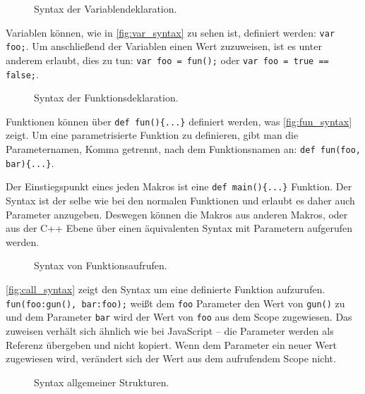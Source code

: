     \begin{figure}[H]
      \centering
      \caption{Syntax der Variablendeklaration.}
      \label{fig:var_syntax}
    \end{figure}
    Variablen können, wie in \autoref{fig:var_syntax} zu sehen ist, definiert werden: \lstinline[style=MyMacroStyle]$var foo;$. Um anschließend der Variablen einen Wert zuzuweisen, ist es unter anderem erlaubt, dies zu tun: \lstinline[style=MyMacroStyle]$var foo = fun();$ oder \lstinline[style=MyMacroStyle]$var foo = true == false;$.

    \begin{figure}[H]
      \centering
      \caption{Syntax der Funktionsdeklaration.}
      \label{fig:fun_syntax}
    \end{figure}
    Funktionen können über \lstinline[style=MyMacroStyle]$def fun(){...}$ definiert werden, was \autoref{fig:fun_syntax} zeigt. Um eine parametrisierte Funktion zu definieren, gibt man die Parameternamen, Komma getrennt, nach dem Funktionsnamen an: \lstinline[style=MyMacroStyle]$def fun(foo, bar){...}$.

    Der Einstiegspunkt eines jeden Makros ist eine \lstinline[style=MyMacroStyle]$def main(){...}$ Funktion. Der Syntax ist der selbe wie bei den normalen Funktionen und erlaubt es daher auch Parameter anzugeben. Deswegen können die Makros aus anderen Makros, oder aus der C++ Ebene über einen äquivalenten Syntax mit Parametern aufgerufen werden.

    \begin{figure}[H]
      \centering
      \caption{Syntax von Funktionsaufrufen.}
      \label{fig:call_syntax}
    \end{figure}
    \autoref{fig:call_syntax} zeigt den Syntax um eine definierte Funktion aufzurufen. \lstinline[style=MyMacroStyle]$fun(foo:gun(), bar:foo);$ weißt dem \lstinline[style=MyMacroStyle]$foo$ Parameter den Wert von \lstinline[style=MyMacroStyle]$gun()$ zu und dem Parameter \lstinline[style=MyMacroStyle]$bar$ wird der Wert von \lstinline[style=MyMacroStyle]$foo$ aus dem Scope zugewiesen. Das zuweisen verhält sich ähnlich wie bei JavaScript -- die Parameter werden als Referenz übergeben und nicht kopiert. Wenn dem Parameter ein neuer Wert zugewiesen wird, verändert sich der Wert aus dem aufrufendem Scope nicht.

    \begin{figure}[H]
      \centering
      \caption{Syntax allgemeiner Strukturen.}
      \label{fig:common_syntax}
    \end{figure}

